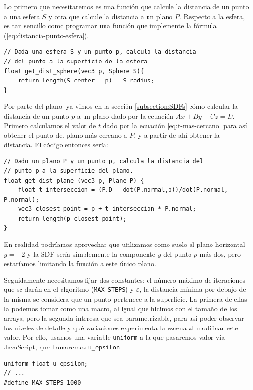 Lo primero que necesitaremos es una función que calcule la distancia de un punto a una esfera $S$ y otra que calcule la distancia a un plano $P$. Respecto a la esfera, es tan sencillo como programar una función que implemente la fórmula (\ref{eq:distancia-punto-esfera}).

\begin{lstlisting}
// Dada una esfera S y un punto p, calcula la distancia
// del punto a la superficie de la esfera
float get_dist_sphere(vec3 p, Sphere S){
    return length(S.center - p) - S.radius;
}
\end{lstlisting}

Por parte del plano, ya vimos en la sección \ref{subsection:SDFs} cómo calcular la distancia de un punto $p$ a un plano dado por la ecuación $Ax+By+Cz=D$. Primero calculamos el valor de $t$ dado por la ecuación \ref{eq:t-mas-cercano} para así obtener el punto del plano más cercano a $P$, y a partir de ahí obtener la distancia. El código entonces sería:

\begin{lstlisting}
// Dado un plano P y un punto p, calcula la distancia del 
// punto p a la superficie del plano.
float get_dist_plane (vec3 p, Plane P) {
    float t_interseccion = (P.D - dot(P.normal,p))/dot(P.normal, P.normal);
    vec3 closest_point = p + t_interseccion * P.normal;
    return length(p-closest_point);
}
\end{lstlisting}

En realidad podríamos aprovechar que utilizamos como suelo el plano horizontal $y=-2$ y la SDF sería simplemente la componente $y$ del punto $p$ más dos, pero estaríamos limitando la función a este único plano.

Seguidamente necesitamos fijar dos constantes: el número máximo de iteraciones que se darán en el algoritmo (\texttt{MAX\_STEPS}) y $\varepsilon$, la distancia mínima por debajo de la misma se considera que un punto pertenece a la superficie. La primera de ellas la podemos tomar como una macro, al igual que hicimos con el tamaño de los arrays, pero la segunda interesa que sea parametrizable, para así poder observar los niveles de detalle y qué variaciones experimenta la escena al modificar este valor. Por ello, usamos una variable \verb|uniform| a la que pasaremos valor vía JavaScript, que llamaremos \texttt{u\_epsilon}.

\begin{lstlisting}
uniform float u_epsilon;
// ... 
#define MAX_STEPS 1000
\end{lstlisting}




